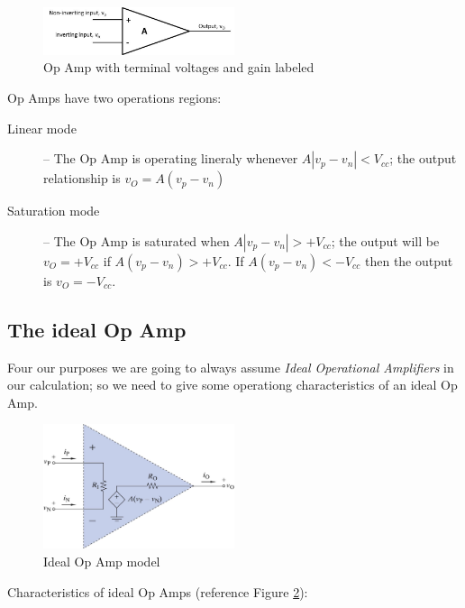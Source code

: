 \documentclass{handout}
\begin{document}
\begin{figure} [h! t! b!]
\centering
\includegraphics[width=0.5\textwidth]{OpAmp2.jpg}
\caption{Op Amp with terminal voltages  and gain labeled}
\label{fig: OpAmp2}
\end{figure}

Op Amps have two operations regions:
\begin{description}
\item[Linear mode] -- The Op Amp is operating lineraly whenever $A|v_p-v_n|<V_{cc}$; the output relationship is $v_O=A(v_p-v_n)$
\item[Saturation mode] -- The Op Amp is saturated when $A|v_p-v_n|>+V_{cc}$; the output will be $v_O=+V_{cc}$ if $A(v_p-v_n)>+V_{cc}$.  If $A(v_p-v_n)<-V_{cc}$ then the output is $v_O=-V_{cc}$.
\end{description}

\subsection{The ideal Op Amp}
Four our purposes we are going to always assume {\em Ideal Operational Amplifiers} in our calculation; so we need to give some operationg characteristics of an ideal Op Amp.  

\begin{figure} [h! t! b!]
\centering
\includegraphics[width=0.5\textwidth]{IdealOpAmpModel.jpg}
\caption{Ideal Op Amp model}
\label{fig: IdealOpAmp}
\end{figure}

Characteristics of ideal Op Amps (reference Figure \ref{fig: IdealOpAmp}):
\end{document}
